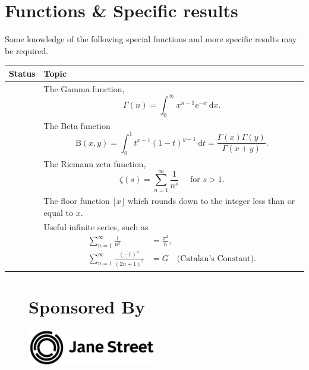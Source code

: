 \documentclass[11pt]{scrartcl}
\providecommand{\isRq}{{\color{green!60!black}\CheckmarkBold}}
\begin{document}
\clearpage

\section{Functions \& Specific results}


Some knowledge of the following special functions and more specific results may be required. 

\begin{center}
	\begin{tabular}{cp{12cm}}
	\toprule Status & Topic \\ \midrule
	\isRq & The Gamma function,
	$$
	\Gamma(n)=\int_{0}^{\infty} x^{n-1} e^{-x} \mathrm{~d} x.
	$$\\
	\isRq & The Beta function
	$$
	\mathrm{B}(x, y)=\int_{0}^{1} t^{x-1}(1-t)^{y-1} \mathrm{~d} t=\frac{\Gamma(x) \Gamma(y)}{\Gamma(x+y)}.
	$$
	\\
	\isRq & The Riemann zeta function,
	$$
	\zeta(s)=\sum_{n=1}^{\infty} \frac{1}{n^{s}} \quad \text { for } s>1.
	$$\\
	\isRq & The floor function $\lfloor x\rfloor$ which rounds down to the integer less than or equal to $x$. \\
	\isRq & Useful infinite series, such as
	$$
	\begin{aligned}
		\sum_{n = 1}^{\infty} \frac{1}{n^2} &= \frac{\pi^2}{6}, \\
		\sum_{n = 1}^{\infty} \frac{(-1)^n}{(2n + 1)^2} &= G \quad \text{(Catalan's Constant).}
	\end{aligned}
	$$
	\\
	\bottomrule
	\end{tabular}
\end{center}


\begin{figure}[!b]
	\centering
	\section*{\centering Sponsored By}
	

	\includegraphics[width=0.5\textwidth]{jslogo.png}
\end{figure}
\end{document}
